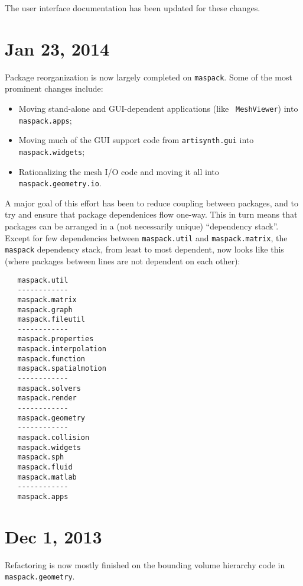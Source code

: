 \documentclass{article}
\begin{document}
The user interface documentation has been updated for these changes.

\section*{Jan 23, 2014}

Package reorganization is now largely completed on {\tt maspack}.
Some of the most prominent changes include:

\begin{itemize}

\item Moving stand-alone and GUI-dependent applications (like {\tt
MeshViewer}) into {\tt maspack.apps};

\item Moving much of the GUI support code from {\tt artisynth.gui}
into {\tt maspack.widgets};

\item Rationalizing the mesh I/O code and moving it all
into {\tt maspack.geometry.io}.

\end{itemize}

A major goal of this effort has been to reduce coupling between
packages, and to try and ensure that package dependenices flow
one-way. This in turn means that packages can be arranged in a (not
necessarily unique) ``dependency stack''. Except for few dependencies
between {\tt maspack.util} and {\tt maspack.matrix}, the {\tt maspack}
dependency stack, from least to most dependent, now looks like this
(where packages between lines are not dependent on each other):

\begin{lstlisting}
   maspack.util
   ------------
   maspack.matrix
   maspack.graph
   maspack.fileutil
   ------------
   maspack.properties
   maspack.interpolation
   maspack.function
   maspack.spatialmotion
   ------------
   maspack.solvers
   maspack.render
   ------------
   maspack.geometry
   ------------
   maspack.collision
   maspack.widgets
   maspack.sph
   maspack.fluid
   maspack.matlab
   ------------
   maspack.apps
\end{lstlisting}

\section*{Dec 1, 2013}

Refactoring is now mostly finished on the bounding volume hierarchy
code in {\tt maspack.geometry}.
\end{document}
